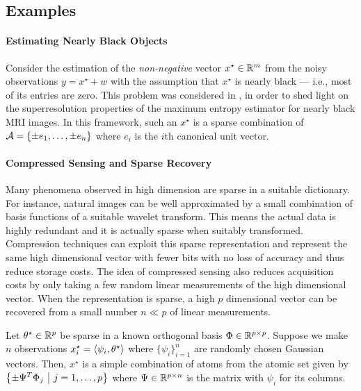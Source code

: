 \subsection{Examples}

\paragraph{Estimating Nearly Black Objects}

Consider the estimation of the \emph{non-negative} vector $x^\star \in \mathbb{R}^m$
from the noisy observations $y = x^\star + w$ with the assumption that $x^\star$
is nearly black --- i.e., most of its entries are zero. This problem was
considered in \cite{DonohoNearlyBlack92,JohnstoneSparse94}, in order to shed
light on the superresolution properties of the maximum entropy estimator for
nearly black MRI images. In this framework, such an $x^\star$ is a sparse
combination of $\mathcal{A} = \{ \pm e_1, \dots, \pm e_n\}$ where $e_i$ is the $i$th
canonical unit vector.

\paragraph{Compressed Sensing and Sparse Recovery}

Many phenomena observed in high dimension are sparse in a suitable dictionary.
For instance, natural images can be well approximated by a small combination of
basis functions of a suitable wavelet transform. This means the actual data is
highly redundant and it is actually sparse when suitably transformed.
Compression techniques can exploit this sparse representation and represent the
same high dimensional vector with fewer bits with no loss of accuracy and thus
reduce storage costs. The idea of compressed sensing also reduces acquisition
costs by only taking a few random linear measurements of the high dimensional
vector. When the representation is sparse, a high $p$ dimensional vector can be
recovered from a small number $n \ll p$ of linear measurements.

Let $\theta^\star \in \mathbb{R}^p$ be sparse in a known orthogonal basis $\Phi \in
\mathbb{R}^{p \times p}$. Suppose we make $n$ observations $x^\star_i =
\langle\psi_i, \theta^\star\rangle$ where $\{\psi_i\}_{i=1}^n$ are randomly chosen
Gaussian vectors. Then, $x^\star$ is a simple combination of atoms from the
atomic set given by $\left\{ \pm \Psi^T \Phi_j ~\middle|~ j=1,\ldots,p \right\}$ where $\Psi \in
\mathbb{R}^{p \times n}$ is the matrix with $\psi_i$ for its columns.

